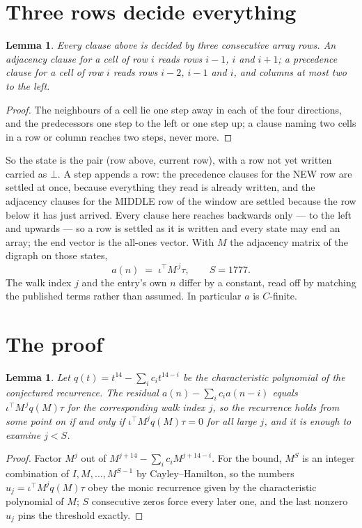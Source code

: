 \documentclass[11pt,a4paper]{article}
\theoremstyle{plain}
\newtheorem{lemma}[theorem]{Lemma}
\theoremstyle{definition}
\begin{document}
\section{Three rows decide everything}

\begin{lemma}\label{lem:win}
Every clause above is decided by three consecutive array rows. An adjacency clause for a cell
of row $i$ reads rows $i-1$, $i$ and $i+1$; a precedence clause for a cell of row $i$ reads
rows $i-2$, $i-1$ and $i$, and columns at most two to the left.
\end{lemma}

\begin{proof}
The neighbours of a cell lie one step away in each of the four directions, and the predecessors
one step to the left or one step up; a clause naming two cells in a row or column reaches two
steps, never more.
\end{proof}

So the state is the pair (row above, current row), with a row not yet written carried as
$\bot$. A step appends a row: the precedence clauses for the NEW row are settled at once,
because everything they read is already written, and the adjacency clauses for the MIDDLE row
of the window are settled because the row below it has just arrived. Every clause here reaches backwards only --- to the left and upwards --- so a
row is settled as it is written and every state may end an array; the end vector is the
all-ones vector. With $M$ the
adjacency matrix of the digraph on those states,
\[
a(n)\;=\;\iota^{\!\top}M^{\,j}\tau ,\qquad S=1777.
\]
The walk index $j$ and the entry's own $n$ differ by a constant, read off by matching the
published terms rather than assumed. In particular $a$ is $C$-finite.

\section{The proof}

\begin{lemma}\label{lem:crit}
Let $q(t)=t^{14}-\sum_i c_it^{14-i}$ be the characteristic polynomial of the
conjectured recurrence. The residual $a(n)-\sum_ic_ia(n-i)$ equals
$\iota^{\!\top}M^{\,j}q(M)\tau$ for the corresponding walk index $j$, so the recurrence
holds from some point on if and only if $\iota^{\!\top}M^{j}q(M)\tau=0$ for all large $j$,
and it is enough to examine $j<S$.
\end{lemma}

\begin{proof}
Factor $M^{j}$ out of $M^{j+14}-\sum_ic_iM^{j+14-i}$. For the bound, $M^{S}$
is an integer combination of $I,M,\dots,M^{S-1}$ by Cayley--Hamilton, so the numbers
$u_j=\iota^{\!\top}M^{j}q(M)\tau$ obey the monic recurrence given by the characteristic
polynomial of $M$; $S$ consecutive zeros force every later one, and the last nonzero $u_j$
pins the threshold exactly.
\end{proof}
\end{document}
